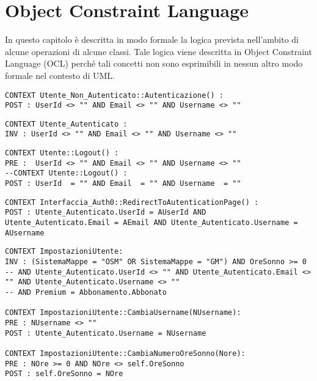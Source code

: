 \section{Object Constraint Language}
\label{secD3:ObjectConstraintLanguage}

In questo capitolo è descritta in modo formale la logica prevista nell'ambito di alcune operazioni di alcune classi. Tale logica viene descritta in Object Constraint Language (OCL) perché tali concetti non sono esprimibili in nessun altro modo formale nel contesto di UML.


\begin{listaPersonale}[OCL]{}
    \begin{lstlisting}
CONTEXT Utente_Non_Autenticato::Autenticazione() : 
POST : UserId <> "" AND Email <> "" AND Username <> ""
    \end{lstlisting}
    \begin{lstlisting}
CONTEXT Utente_Autenticato : 
INV : UserId <> "" AND Email <> "" AND Username <> ""
    \end{lstlisting}
    \begin{lstlisting}
CONTEXT Utente::Logout() : 
PRE :  UserId <> "" AND Email <> "" AND Username <> ""
--CONTEXT Utente::Logout() : 
POST : UserId  = "" AND Email  = "" AND Username  = ""
    \end{lstlisting}



    \begin{lstlisting}
CONTEXT Interfaccia_Auth0::RedirectToAutenticationPage() :
POST : Utente_Autenticato.UserId = AUserId AND Utente_Autenticato.Email = AEmail AND Utente_Autenticato.Username = AUsername
    \end{lstlisting}




    \begin{lstlisting}
CONTEXT ImpostazioniUtente:
INV : (SistemaMappe = "OSM" OR SistemaMappe = "GM") AND OreSonno >= 0 
-- AND Utente_Autenticato.UserId <> "" AND Utente_Autenticato.Email <> "" AND Utente_Autenticato.Username <> ""
-- AND Premium = Abbonamento.Abbonato

CONTEXT ImpostazioniUtente::CambiaUsername(NUsername):
PRE : NUsername <> ""
POST : Utente_Autenticato.Username = NUsername

CONTEXT ImpostazioniUtente::CambiaNumeroOreSonno(Nore):
PRE : NOre >= 0 AND NOre <> self.OreSonno
POST : self.OreSonno = NOre


\end{lstlisting}
\end{listaPersonale}

